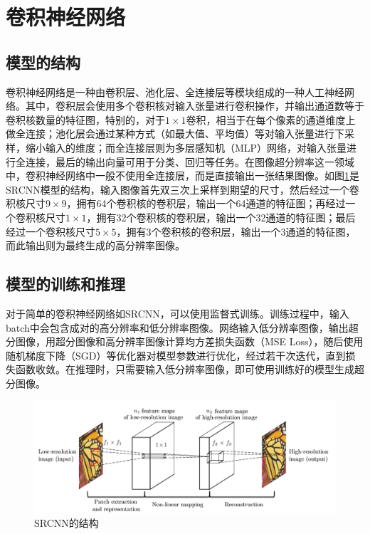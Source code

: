 \section{卷积神经网络}
\subsection{模型的结构}
卷积神经网络是一种由卷积层、池化层、全连接层等模块组成的一种人工神经网络。其中，卷积层会使用多个卷积核对输入张量进行卷积操作，并输出通道数等于卷积核数量的特征图，特别的，对于$1\times 1$卷积，相当于在每个像素的通道维度上做全连接；池化层会通过某种方式（如最大值、平均值）等对输入张量进行下采样，缩小输入的维度；而全连接层则为多层感知机（MLP）网络，对输入张量进行全连接，最后的输出向量可用于分类、回归等任务。在图像超分辨率这一领域中，卷积神经网络中一般不使用全连接层，而是直接输出一张结果图像。如图\ref{fig:SRCNN}是SRCNN模型的结构，输入图像首先双三次上采样到期望的尺寸，然后经过一个卷积核尺寸$9\times 9$，拥有64个卷积核的卷积层，输出一个64通道的特征图；再经过一个卷积核尺寸$1\times 1$，拥有32个卷积核的卷积层，输出一个32通道的特征图；最后经过一个卷积核尺寸$5\times 5$，拥有3个卷积核的卷积层，输出一个3通道的特征图，而此输出则为最终生成的高分辨率图像。
\subsection{模型的训练和推理}
对于简单的卷积神经网络如SRCNN，可以使用监督式训练。训练过程中，输入batch中会包含成对的高分辨率和低分辨率图像。网络输入低分辨率图像，输出超分图像，用超分图像和高分辨率图像计算均方差损失函数（MSE Loss），随后使用随机梯度下降（SGD）等优化器对模型参数进行优化，经过若干次迭代，直到损失函数收敛。在推理时，只需要输入低分辨率图像，即可使用训练好的模型生成超分图像。

\begin{figure}[h]
    \centering
    \includegraphics[width=1.0\textwidth]{imgs/SRCNN.png}
    \caption{SRCNN的结构}
    \label{fig:SRCNN}
\end{figure}

